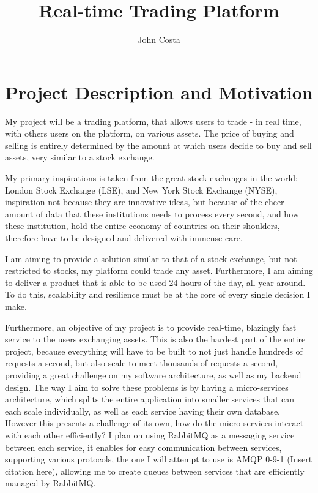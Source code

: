 \documentclass[titlepage]{article}
\title{Real-time Trading Platform}
\author{John Costa}
\begin{document}
\maketitle

\section{Project Description and Motivation}
My project will be a trading platform, that allows users to trade - in real time, with others users on the platform, on various assets. The price of buying and selling is entirely determined by the amount at which users decide to buy and sell assets, very similar to a stock exchange.

My primary inspirations is taken from the great stock exchanges in the world: London Stock Exchange (LSE), and New York Stock Exchange (NYSE), inspiration not because they are innovative ideas, but because of the cheer amount of data that these institutions needs to process every second, and how these institution, hold the entire economy of countries on their shoulders, therefore have to be designed and delivered with immense care.

I am aiming to provide a solution similar to that of a stock exchange, but not restricted to stocks, my platform could trade any asset. Furthermore, I am aiming to deliver a product that is able to be used 24 hours of the day, all year around. To do this, scalability and resilience must be at the core of every single decision I make.

Furthermore, an objective of my project is to provide real-time, blazingly fast service to the users exchanging assets. This is also the hardest part of the entire project, because everything will have to be built to not just handle hundreds of requests a second, but also scale to meet thousands of requests a second, providing a great challenge on my software architecture, as well as my backend design. The way I aim to solve these problems is by having a micro-services architecture, which splits the entire application into smaller services that can each scale individually, as well as each service having their own database. However this presents a challenge of its own, how do the micro-services interact with each other efficiently? I plan on using RabbitMQ as a messaging service between each service, it enables for easy communication between services, supporting various protocols, the one I will attempt to use is AMQP 0-9-1 (Insert citation here), allowing me to create queues between services that are efficiently managed by RabbitMQ.
\end{document}
